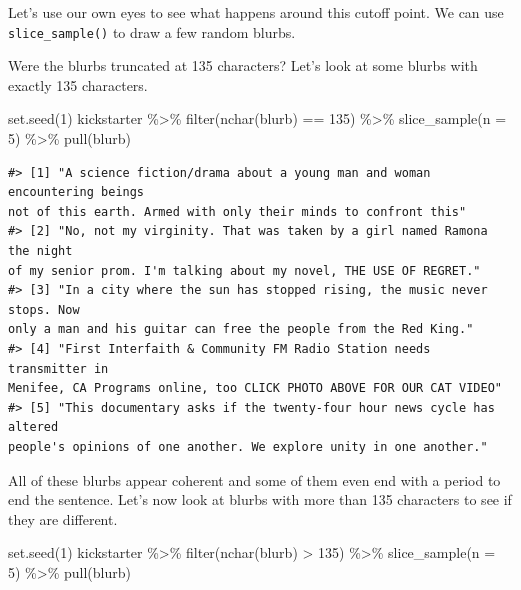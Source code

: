 \documentclass[
]{krantz}
\makeatletter
\newenvironment{Shaded}{\begin{snugshade}}{\end{snugshade}}
\newcommand{\AttributeTok}[1]{\textcolor[rgb]{0.77,0.63,0.00}{#1}}
\newcommand{\DecValTok}[1]{\textcolor[rgb]{0.00,0.00,0.81}{#1}}
\newcommand{\FunctionTok}[1]{\textcolor[rgb]{0.00,0.00,0.00}{#1}}
\newcommand{\NormalTok}[1]{#1}
\newcommand{\SpecialCharTok}[1]{\textcolor[rgb]{0.00,0.00,0.00}{#1}}
\newenvironment{kframe}{%
\medskip{}
\setlength{\fboxsep}{.8em}
 \def\at@end@of@kframe{}%
 \ifinner\ifhmode%
  \def\at@end@of@kframe{\end{minipage}}%
  \begin{minipage}{\columnwidth}%
 \fi\fi%
 \def\FrameCommand##1{\hskip\@totalleftmargin \hskip-\fboxsep
 \colorbox{shadecolor}{##1}\hskip-\fboxsep
     \hskip-\linewidth \hskip-\@totalleftmargin \hskip\columnwidth}%
 \MakeFramed {\advance\hsize-\width
   \@totalleftmargin\z@ \linewidth\hsize
   \@setminipage}}%
 {\par\unskip\endMakeFramed%
 \at@end@of@kframe}
\renewenvironment{Shaded}{\begin{kframe}}{\end{kframe}}
\makeatother
\begin{document}
Let's use our own eyes to see what happens around this cutoff point. We can use \texttt{slice\_sample()} to draw a few random blurbs.

Were the blurbs truncated at 135 characters? Let's look at some blurbs with exactly 135 characters.

\begin{Shaded}
\begin{Highlighting}[]
\FunctionTok{set.seed}\NormalTok{(}\DecValTok{1}\NormalTok{)}
\NormalTok{kickstarter }\SpecialCharTok{\%\textgreater{}\%}
  \FunctionTok{filter}\NormalTok{(}\FunctionTok{nchar}\NormalTok{(blurb) }\SpecialCharTok{==} \DecValTok{135}\NormalTok{) }\SpecialCharTok{\%\textgreater{}\%}
  \FunctionTok{slice\_sample}\NormalTok{(}\AttributeTok{n =} \DecValTok{5}\NormalTok{) }\SpecialCharTok{\%\textgreater{}\%}
  \FunctionTok{pull}\NormalTok{(blurb)}
\end{Highlighting}
\end{Shaded}

\begin{verbatim}
#> [1] "A science fiction/drama about a young man and woman encountering beings
not of this earth. Armed with only their minds to confront this"
#> [2] "No, not my virginity. That was taken by a girl named Ramona the night
of my senior prom. I'm talking about my novel, THE USE OF REGRET."
#> [3] "In a city where the sun has stopped rising, the music never stops. Now
only a man and his guitar can free the people from the Red King."
#> [4] "First Interfaith & Community FM Radio Station needs transmitter in
Menifee, CA Programs online, too CLICK PHOTO ABOVE FOR OUR CAT VIDEO"
#> [5] "This documentary asks if the twenty-four hour news cycle has altered
people's opinions of one another. We explore unity in one another."
\end{verbatim}

All of these blurbs appear coherent and some of them even end with a period to end the sentence. Let's now look at blurbs with more than 135 characters to see if they are different.

\begin{Shaded}
\begin{Highlighting}[]
\FunctionTok{set.seed}\NormalTok{(}\DecValTok{1}\NormalTok{)}
\NormalTok{kickstarter }\SpecialCharTok{\%\textgreater{}\%}
  \FunctionTok{filter}\NormalTok{(}\FunctionTok{nchar}\NormalTok{(blurb) }\SpecialCharTok{\textgreater{}} \DecValTok{135}\NormalTok{) }\SpecialCharTok{\%\textgreater{}\%}
  \FunctionTok{slice\_sample}\NormalTok{(}\AttributeTok{n =} \DecValTok{5}\NormalTok{) }\SpecialCharTok{\%\textgreater{}\%}
  \FunctionTok{pull}\NormalTok{(blurb)}
\end{Highlighting}
\end{Shaded}
\end{document}

